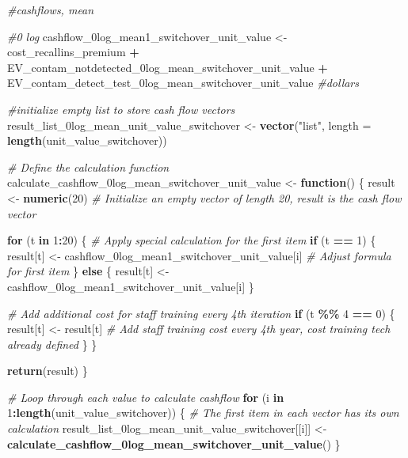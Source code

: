 \documentclass[
]{article}
\newenvironment{Shaded}{\begin{snugshade}}{\end{snugshade}}
\newcommand{\AttributeTok}[1]{\textcolor[rgb]{0.13,0.29,0.53}{#1}}
\newcommand{\CommentTok}[1]{\textcolor[rgb]{0.56,0.35,0.01}{\textit{#1}}}
\newcommand{\ControlFlowTok}[1]{\textcolor[rgb]{0.13,0.29,0.53}{\textbf{#1}}}
\newcommand{\DecValTok}[1]{\textcolor[rgb]{0.00,0.00,0.81}{#1}}
\newcommand{\FunctionTok}[1]{\textcolor[rgb]{0.13,0.29,0.53}{\textbf{#1}}}
\newcommand{\NormalTok}[1]{#1}
\newcommand{\OtherTok}[1]{\textcolor[rgb]{0.56,0.35,0.01}{#1}}
\newcommand{\SpecialCharTok}[1]{\textcolor[rgb]{0.81,0.36,0.00}{\textbf{#1}}}
\newcommand{\StringTok}[1]{\textcolor[rgb]{0.31,0.60,0.02}{#1}}
\begin{document}
\begin{Shaded}
\begin{Highlighting}[]
\CommentTok{\#cashflows, mean}

\CommentTok{\#0 log}
\NormalTok{cashflow\_0log\_mean1\_switchover\_unit\_value }\OtherTok{\textless{}{-}}\NormalTok{ cost\_recallins\_premium }\SpecialCharTok{+}\NormalTok{ EV\_contam\_notdetected\_0log\_mean\_switchover\_unit\_value }\SpecialCharTok{+}\NormalTok{ EV\_contam\_detect\_test\_0log\_mean\_switchover\_unit\_value }\CommentTok{\#dollars}


\CommentTok{\#initialize empty list to store cash flow vectors}
\NormalTok{result\_list\_0log\_mean\_unit\_value\_switchover }\OtherTok{\textless{}{-}} \FunctionTok{vector}\NormalTok{(}\StringTok{"list"}\NormalTok{, }\AttributeTok{length =} \FunctionTok{length}\NormalTok{(unit\_value\_switchover))}


\CommentTok{\# Define the calculation function}
\NormalTok{calculate\_cashflow\_0log\_mean\_switchover\_unit\_value }\OtherTok{\textless{}{-}} \ControlFlowTok{function}\NormalTok{() \{}
\NormalTok{  result }\OtherTok{\textless{}{-}} \FunctionTok{numeric}\NormalTok{(}\DecValTok{20}\NormalTok{)  }\CommentTok{\# Initialize an empty vector of length 20, result is the cash flow vector}
  
  \ControlFlowTok{for}\NormalTok{ (t }\ControlFlowTok{in} \DecValTok{1}\SpecialCharTok{:}\DecValTok{20}\NormalTok{) \{}
    \CommentTok{\# Apply special calculation for the first item}
    \ControlFlowTok{if}\NormalTok{ (t }\SpecialCharTok{==} \DecValTok{1}\NormalTok{) \{}
\NormalTok{      result[t] }\OtherTok{\textless{}{-}}\NormalTok{ cashflow\_0log\_mean1\_switchover\_unit\_value[i] }\CommentTok{\# Adjust formula for first item}
\NormalTok{    \} }\ControlFlowTok{else}\NormalTok{ \{}
\NormalTok{      result[t] }\OtherTok{\textless{}{-}}\NormalTok{ cashflow\_0log\_mean1\_switchover\_unit\_value[i]}
\NormalTok{    \}}
    
    \CommentTok{\# Add additional cost for staff training every 4th iteration}
    \ControlFlowTok{if}\NormalTok{ (t }\SpecialCharTok{\%\%} \DecValTok{4} \SpecialCharTok{==} \DecValTok{0}\NormalTok{) \{}
\NormalTok{      result[t] }\OtherTok{\textless{}{-}}\NormalTok{ result[t]  }\CommentTok{\# Add staff training cost every 4th year, cost training tech already defined}
\NormalTok{    \}}
\NormalTok{  \}}
  
  \FunctionTok{return}\NormalTok{(result)}
\NormalTok{\}}

\CommentTok{\# Loop through each value to calculate cashflow}
\ControlFlowTok{for}\NormalTok{ (i }\ControlFlowTok{in} \DecValTok{1}\SpecialCharTok{:}\FunctionTok{length}\NormalTok{(unit\_value\_switchover)) \{}
  \CommentTok{\# The first item in each vector has its own calculation}
\NormalTok{  result\_list\_0log\_mean\_unit\_value\_switchover[[i]] }\OtherTok{\textless{}{-}} \FunctionTok{calculate\_cashflow\_0log\_mean\_switchover\_unit\_value}\NormalTok{()}
\NormalTok{\}}



\end{Highlighting}
\end{Shaded}
\end{document}
